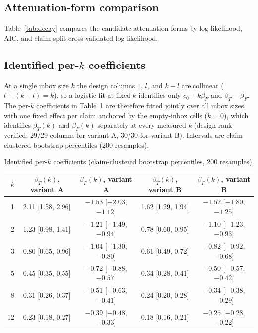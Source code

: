 \documentclass{ieeeaccess}
\begin{document}
\subsection{Attenuation-form comparison}\label{app:decay}
Table~\ref{tab:decay} compares the candidate attenuation forms by log-likelihood, AIC, and claim-split cross-validated log-likelihood.
\begin{table}[!t]
\caption{Attenuation-form comparison (five-fold cross-validation with folds split by claim).}
\label{tab:decay}
\centering\small
\resizebox{\columnwidth}{!}{}
\end{table}

\subsection{Identified per-$k$ coefficients}

At a single inbox size $k$ the design columns $1$, $l$, and $k-l$ are
collinear ($l + (k-l) = k$), so a logistic fit at fixed $k$ identifies only
$c_0 + k\beta_F$ and $\beta_T - \beta_F$. The per-$k$ coefficients in Table~\ref{tab:perk} are
therefore fitted jointly over all inbox sizes, with one fixed effect per claim
anchored by the empty-inbox cells ($k = 0$), which identifies
$\beta_T(k)$ and $\beta_F(k)$ separately at every measured $k$ (design rank
verified: 29/29 columns for variant A, 30/30 for variant B). Intervals are
claim-clustered bootstrap percentiles (200 resamples).

\begin{table}[!t]
\caption{Identified per-$k$ coefficients (claim-clustered bootstrap percentiles, 200 resamples).}
\label{tab:perk}
\centering\small
{%
\begin{tabular}{rcccc}
\toprule
$k$ & $\beta_T(k)$, variant A & $\beta_F(k)$, variant A & $\beta_T(k)$, variant B & $\beta_F(k)$, variant B \\
\midrule
1  & 2.11 [1.58, 2.96] & $-1.53$ [$-2.03$, $-1.12$] & 1.62 [1.29, 1.94] & $-1.52$ [$-1.80$, $-1.25$] \\
2  & 1.23 [0.98, 1.41] & $-1.21$ [$-1.49$, $-0.94$] & 0.78 [0.60, 0.95] & $-1.10$ [$-1.23$, $-0.93$] \\
3  & 0.80 [0.65, 0.96] & $-1.04$ [$-1.30$, $-0.80$] & 0.61 [0.49, 0.72] & $-0.82$ [$-0.92$, $-0.68$] \\
5  & 0.45 [0.35, 0.55] & $-0.72$ [$-0.88$, $-0.57$] & 0.34 [0.28, 0.41] & $-0.50$ [$-0.57$, $-0.42$] \\
8  & 0.31 [0.26, 0.37] & $-0.51$ [$-0.63$, $-0.41$] & 0.24 [0.20, 0.28] & $-0.34$ [$-0.38$, $-0.29$] \\
12 & 0.23 [0.18, 0.27] & $-0.39$ [$-0.48$, $-0.33$] & 0.18 [0.16, 0.21] & $-0.25$ [$-0.28$, $-0.22$] \\
\bottomrule
\end{tabular}}
\end{table}
\end{document}
